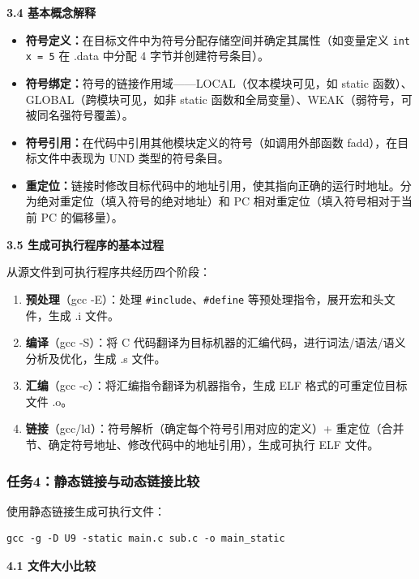 \documentclass[12pt,a4paper]{ctexart}
\begin{document}
\textbf{3.4 基本概念解释}

\begin{itemize}[nosep]
    \item \textbf{符号定义：}在目标文件中为符号分配存储空间并确定其属性（如变量定义 \texttt{int x = 5} 在 .data 中分配 4 字节并创建符号条目）。
    \item \textbf{符号绑定：}符号的链接作用域——LOCAL（仅本模块可见，如 static 函数）、GLOBAL（跨模块可见，如非 static 函数和全局变量）、WEAK（弱符号，可被同名强符号覆盖）。
    \item \textbf{符号引用：}在代码中引用其他模块定义的符号（如调用外部函数 fadd），在目标文件中表现为 UND 类型的符号条目。
    \item \textbf{重定位：}链接时修改目标代码中的地址引用，使其指向正确的运行时地址。分为绝对重定位（填入符号的绝对地址）和 PC 相对重定位（填入符号相对于当前 PC 的偏移量）。
\end{itemize}

\textbf{3.5 生成可执行程序的基本过程}

从源文件到可执行程序共经历四个阶段：

\begin{enumerate}[label=\textcircled{\arabic*},nosep]
    \item \textbf{预处理}（gcc -E）：处理 \texttt{\#include}、\texttt{\#define} 等预处理指令，展开宏和头文件，生成 .i 文件。
    \item \textbf{编译}（gcc -S）：将 C 代码翻译为目标机器的汇编代码，进行词法/语法/语义分析及优化，生成 .s 文件。
    \item \textbf{汇编}（gcc -c）：将汇编指令翻译为机器指令，生成 ELF 格式的可重定位目标文件 .o。
    \item \textbf{链接}（gcc/ld）：符号解析（确定每个符号引用对应的定义）+ 重定位（合并节、确定符号地址、修改代码中的地址引用），生成可执行 ELF 文件。
\end{enumerate}

\subsubsection*{任务4：静态链接与动态链接比较}

使用静态链接生成可执行文件：

\begin{lstlisting}
gcc -g -D U9 -static main.c sub.c -o main_static
\end{lstlisting}

\textbf{4.1 文件大小比较}
\end{document}

